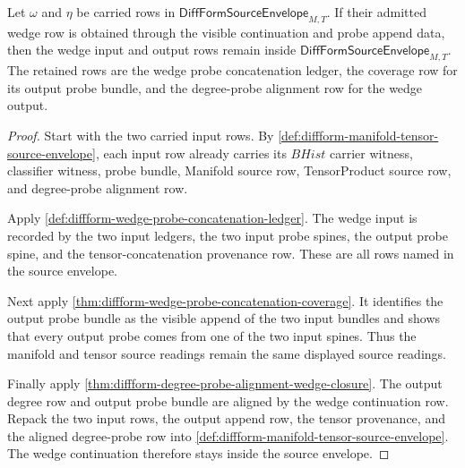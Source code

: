\begin{theorem}
\label{thm:diffform-wedge-continuation-input-closure}
Let $\omega$ and $\eta$ be carried rows in
$\mathsf{DiffFormSourceEnvelope}_{M,T}$. If their admitted wedge row is
obtained through the visible continuation and probe append data, then the
wedge input and output rows remain inside
$\mathsf{DiffFormSourceEnvelope}_{M,T}$. The retained rows are the wedge probe
concatenation ledger, the coverage row for its output probe bundle, and the
degree-probe alignment row for the wedge output.
\end{theorem}
\begin{proof}
Start with the two carried input rows. By
\autoref{def:diffform-manifold-tensor-source-envelope}, each input row already
carries its $BHist$ carrier witness, classifier witness, probe bundle,
Manifold source row, TensorProduct source row, and degree-probe alignment row.

Apply \autoref{def:diffform-wedge-probe-concatenation-ledger}. The wedge input
is recorded by the two input ledgers, the two input probe spines, the output
probe spine, and the tensor-concatenation provenance row. These are all rows
named in the source envelope.

Next apply \autoref{thm:diffform-wedge-probe-concatenation-coverage}. It
identifies the output probe bundle as the visible append of the two input
bundles and shows that every output probe comes from one of the two input
spines. Thus the manifold and tensor source readings remain the same displayed
source readings.

Finally apply
\autoref{thm:diffform-degree-probe-alignment-wedge-closure}. The output degree
row and output probe bundle are aligned by the wedge continuation row. Repack
the two input rows, the output append row, the tensor provenance, and the
aligned degree-probe row into
\autoref{def:diffform-manifold-tensor-source-envelope}. The wedge continuation
therefore stays inside the source envelope.
\end{proof}

